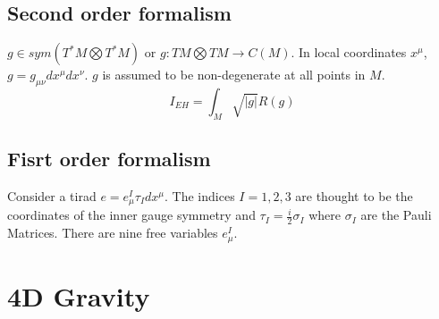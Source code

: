 \documentclass{article}
\begin{document}
\subsection{Second order formalism}
\label{sec-2-1}
$g \in sym(T^*M \bigotimes T^*M)$ or $g:TM \bigotimes TM \rightarrow C(M)$. In local coordinates $x^{\mu}$, $g = g_{\mu\nu} dx^{\mu}dx^{\nu}$. $g$ is assumed to be non-degenerate at all points in $M$.
\begin{equation}
\label{}
I_{EH} = \int_{M}\sqrt{|g|}R(g)
\end{equation}
\subsection{Fisrt order formalism}
\label{sec-2-2}
Consider a tirad $e = e_{\mu}^{I}\tau_{I}dx^{\mu}$. The indices $I=1,2,3$ are thought to be the coordinates of the inner gauge symmetry and $\tau_{I} = \frac{i}{2} \sigma_{I}$ where $\sigma_{I}$ are the Pauli Matrices. There are nine free variables $e_{\mu}^{I}$.

\section{4D Gravity}
\label{sec-3}
\end{document}
